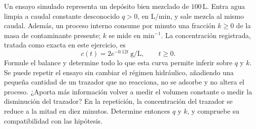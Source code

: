 Un ensayo simulado representa un depósito bien mezclado de \(100\,\mathrm L\). Entra agua limpia a caudal constante desconocido \(q>0\), en \(\mathrm{L/min}\), y sale mezcla al mismo caudal. Además, un proceso interno consume por minuto una fracción \(k\ge0\) de la masa de contaminante presente; \(k\) se mide en \(\mathrm{min}^{-1}\). La concentración registrada, tratada como exacta en este ejercicio, es
\[
c(t)=2e^{-0.12t}\ \mathrm{g/L},\qquad t\ge0.
\]
Formule el balance y determine todo lo que esta curva permite inferir sobre \(q\) y \(k\). Se puede repetir el ensayo sin cambiar el régimen hidráulico, añadiendo una pequeña cantidad de un trazador que no reacciona, no se adsorbe y no altera el proceso. ¿Aporta más información volver a medir el volumen constante o medir la disminución del trazador? En la repetición, la concentración del trazador se reduce a la mitad en diez minutos. Determine entonces \(q\) y \(k\), y compruebe su compatibilidad con las hipótesis.
